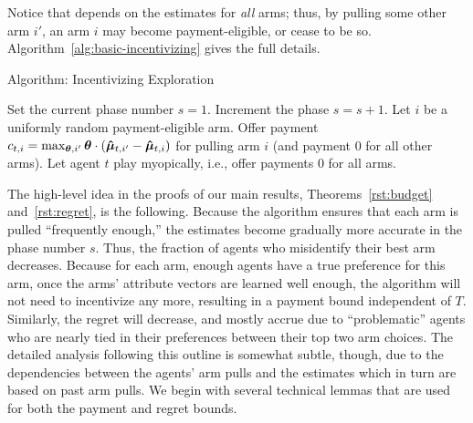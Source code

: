 Notice that  depends on the estimates for \emph{all}
arms; thus, by pulling some other arm $i'$, an arm $i$ may become
payment-eligible, or cease to be so.
Algorithm~\ref{alg:basic-incentivizing} gives the full details.


\begin{algorithm}
\caption{Algorithm: Incentivizing Exploration \label{alg:basic-incentivizing}}
\begin{algorithmic}
\STATE Set the current phase number $s = 1$.
\STATE Increment the phase $s = s + 1$.
\ENDIF
{}
\STATE Let $i$ be a uniformly random payment-eligible arm.
\STATE Offer payment
$c_{t,i} = \max_{\bm{\theta},i'} \bm{\theta} \cdot (\bm{\hat{\mu}}_{t,i'} - \bm{\hat{\mu}}_{t,i})$
for pulling arm $i$
(and payment 0 for all other arms).
\ELSE
\STATE Let agent $t$ play myopically, i.e., offer payments 0 for all arms.
\ENDIF
\ENDFOR
\end{algorithmic}
\end{algorithm}

The high-level idea in the proofs of our main results, Theorems~\ref{rst:budget} and~\ref{rst:regret},
is the following.
Because the algorithm ensures that each arm is pulled
``frequently enough,''
the estimates  become gradually more accurate in the
phase number $s$.
Thus, the fraction of agents who misidentify their best arm decreases.
Because for each arm, enough agents have a true preference for this
arm, once the arms' attribute vectors are learned well enough,
the algorithm will not need to incentivize any more,
resulting in a payment bound independent of $T$.
Similarly, the regret will decrease, and mostly accrue
due to ``problematic'' agents who are nearly tied in their preferences
between their top two arm choices.
The detailed analysis following this outline is somewhat subtle, though,
due to the dependencies between the agents' arm pulls and the
estimates which in turn are based on past arm pulls.
We begin with several technical lemmas that are used for both the
payment and regret bounds.


